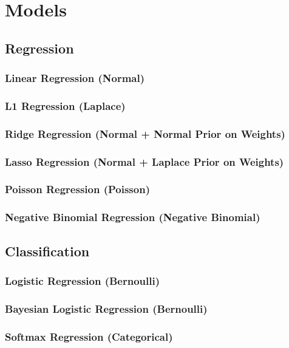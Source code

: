 \section{Models}
\subsection{Regression}
\subsubsection{Linear Regression (Normal)}
\subsubsection{L1 Regression (Laplace)}
\subsubsection{Ridge Regression (Normal + Normal Prior on Weights)}
\subsubsection{Lasso Regression (Normal + Laplace Prior on Weights)}
\subsubsection{Poisson Regression (Poisson)}
\subsubsection{Negative Binomial Regression (Negative Binomial)}


\subsection{Classification}
\subsubsection{Logistic Regression (Bernoulli)}
\subsubsection{Bayesian Logistic Regression (Bernoulli)}
\subsubsection{Softmax Regression (Categorical)}
